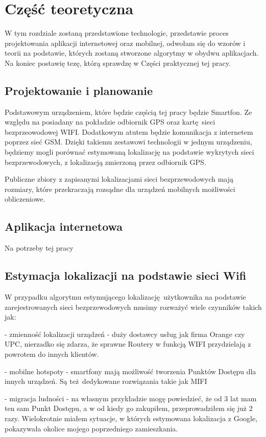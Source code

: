 \chapter{Część teoretyczna}

W tym rozdziale zostaną przedstawione technologie, przedstawie proces projektowania aplikacji internetowej oraz mobilnej, odwołam się do wzorów i teorii na podstawie, których zostaną stworzone algorytmy w obydwu aplikacjach. Na koniec postawię tezę, którą sprawdzę w Części praktycznej tej pracy.

\section{Projektowanie i planowanie}
Podstawowym urządzeniem, które będzie częścią tej pracy będzie Smartfon. Ze względu na posiadany na pokładzie odbiornik GPS oraz kartę sieci bezprzeowodowej WIFI. Dodatkowym atutem będzie komunikacja z internetem poprzez sieć GSM. Dzięki takiemu zestawowi technologii w jednym urządzeniu, będziemy mogli porównać estymowaną lokalizację na podstawie wykrytych sieci bezprzewodowych, z lokalizacją zmierzoną przez odbiornik GPS.



 Publiczne zbiory z zapisanymi lokalizacjami sieci bezprzewodowych mają rozmiary, które przekraczają rozsądne dla urządzeń mobilnych możliwości obliczeniowe.


\section{Aplikacja internetowa}
Na potrzeby tej pracy

\section{Estymacja lokalizacji na podstawie sieci Wifi}
W przypadku algorytmu estymującego lokalizację użytkownika na podstawie zarejestrowanych sieci bezprzewodowych musimy rozważyć wiele czynników takich jak:

- zmienność lokalizacji urządzeń - duży dostawcy usług jak firma Orange czy UPC, nierzadko się zdarza, że sprawne Routery w funkcją WIFI przydzielają z powrotem do innych klientów.

- mobilne hotspoty - smartfony mają możliwość tworzenia Punktów Dostępu dla innych urządzeń. Są też dedykowane rozwiązania takie jak MIFI

- migracja ludności - na własnym przykładzie mogę powiedzieć, że od 3 lat mam ten sam Punkt Dostępu, a w od kiedy go zakupiłem, przeprowadziłem się już 2 razy. Wielokrotnie miałem sytuacje, w których estymowana lokalizacja z Google, pokazywała okolice mojego poprzedniego zamieszkania.
